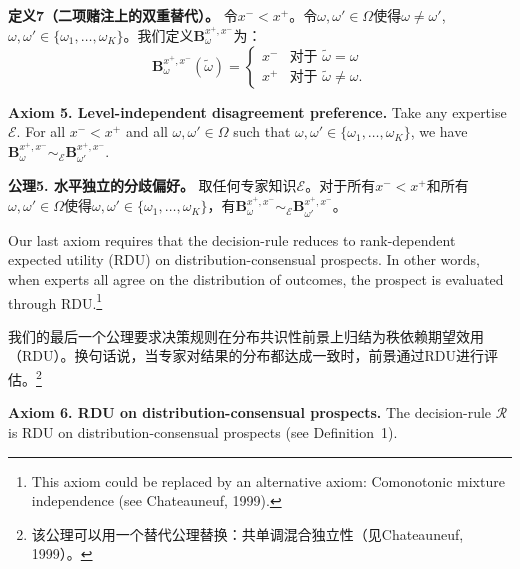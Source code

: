 \documentclass[12pt,a4paper]{article}
\newenvironment{original}
  {\par\noindent\ignorespaces}
  {\par}
\newenvironment{translation}
  {\par\noindent{\color{transblue}\ignorespaces}}
  {\par\medskip}
\begin{document}
\begin{translation}
\textbf{定义7（二项赌注上的双重替代）。} 令$x^{-} < x^{+}$。令$\omega, \omega' \in \Omega$使得$\omega \neq \omega'$, $\omega, \omega' \in \{\omega_{1}, \dots, \omega_{K}\}$。我们定义$\mathbf{B}^{x^{+},x^{-}}_{\omega}$为：
\[
\mathbf{B}^{x^{+},x^{-}}_{\omega}(\tilde{\omega}) =
\begin{cases}
x^{-} & \text{对于 } \tilde{\omega} = \omega\\
x^{+} & \text{对于 } \tilde{\omega} \neq \omega.
\end{cases}
\]
\end{translation}

\begin{original}
\textbf{Axiom 5. Level-independent disagreement preference.} Take any expertise $\mathcal{E}$. For all $x^{-} < x^{+}$ and all $\omega, \omega' \in \Omega$ such that $\omega, \omega' \in \{\omega_{1}, \dots, \omega_{K}\}$, we have $\mathbf{B}^{x^{+},x^{-}}_{\omega} \sim_{\mathcal{E}} \mathbf{B}^{x^{+},x^{-}}_{\omega'}$.
\end{original}

\begin{translation}
\textbf{公理5. 水平独立的分歧偏好。} 取任何专家知识$\mathcal{E}$。对于所有$x^{-} < x^{+}$和所有$\omega, \omega' \in \Omega$使得$\omega, \omega' \in \{\omega_{1}, \dots, \omega_{K}\}$，有$\mathbf{B}^{x^{+},x^{-}}_{\omega} \sim_{\mathcal{E}} \mathbf{B}^{x^{+},x^{-}}_{\omega'}$。
\end{translation}

\begin{original}
Our last axiom requires that the decision-rule reduces to rank-dependent expected utility (RDU) on distribution-consensual prospects. In other words, when experts all agree on the distribution of outcomes, the prospect is evaluated through RDU.\footnote{This axiom could be replaced by an alternative axiom: Comonotonic mixture independence (see Chateauneuf, 1999).}
\end{original}

\begin{translation}
我们的最后一个公理要求决策规则在分布共识性前景上归结为秩依赖期望效用（RDU）。换句话说，当专家对结果的分布都达成一致时，前景通过RDU进行评估。\footnote{该公理可以用一个替代公理替换：共单调混合独立性（见Chateauneuf, 1999）。}
\end{translation}

\begin{original}
\textbf{Axiom 6. RDU on distribution-consensual prospects.} The decision-rule $\mathcal{R}$ is RDU on distribution-consensual prospects (see Definition~1).
\end{original}
\end{document}
